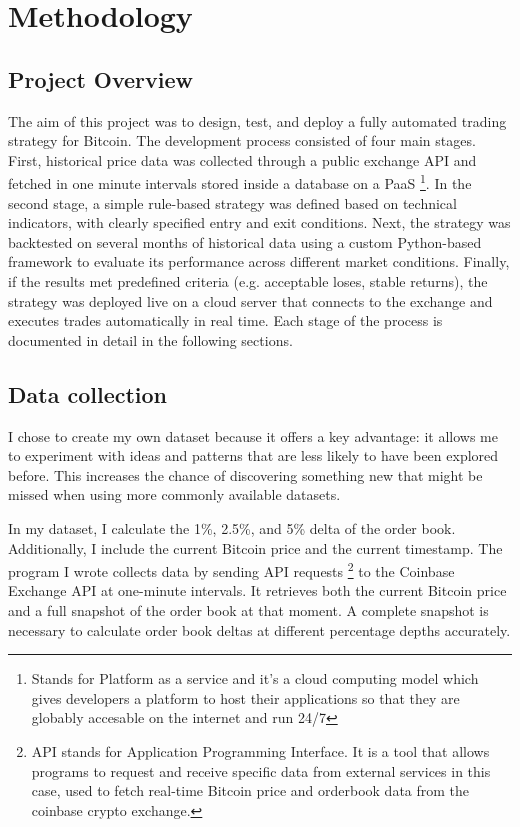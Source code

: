 \documentclass[12pt]{article}
\begin{document}
\newpage
\section{Methodology}

\subsection{Project Overview}
The aim of this project was to design, test, and deploy a fully automated trading strategy for Bitcoin. The development process consisted of four main stages. First, historical price data was collected through a public exchange API and fetched in one minute intervals stored inside a database on a PaaS \footnote[1]{Stands for Platform as a service and it's a cloud computing model which gives developers a platform to host their applications so that they are globably accesable on the internet and run 24/7}. In the second stage, a simple rule-based strategy was defined based on technical indicators, with clearly specified entry and exit conditions. Next, the strategy was backtested on several months of historical data using a custom Python-based framework to evaluate its performance across different market conditions. Finally, if the results met predefined criteria (e.g. acceptable loses, stable returns), the strategy was deployed live on a cloud server that connects to the exchange and executes trades automatically in real time. Each stage of the process is documented in detail in the following sections.

\subsection{Data collection}




I chose to create my own dataset because it offers a key advantage: it allows me to experiment with ideas and patterns that are less likely to have been explored before. This increases the chance of discovering something new that might be missed when using more commonly available datasets.

In my dataset, I calculate the 1\%, 2.5\%, and 5\% delta of the order book. Additionally, I include the current Bitcoin price and the current timestamp. The program I wrote collects data by sending API requests \footnote[2]{API stands for Application Programming Interface. It is a tool that allows programs to request and receive specific data from external services in this case, used to fetch real-time Bitcoin price and orderbook data from the coinbase crypto exchange.} to the Coinbase Exchange API at one-minute intervals. It retrieves both the current Bitcoin price and a full snapshot of the order book at that moment. A complete snapshot is necessary to calculate order book deltas at different percentage depths accurately.
\end{document}

